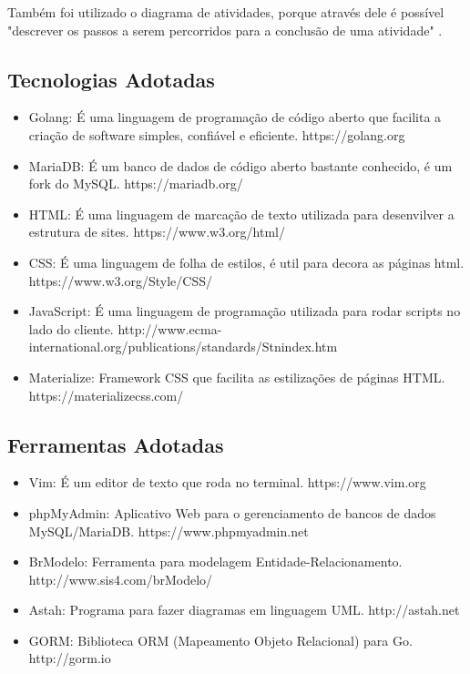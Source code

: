 \documentclass[12pt]{article}
\begin{document}
    Também foi utilizado o diagrama de atividades, porque através dele é possível "descrever os passos a serem percorridos para a conclusão de uma atividade" \cite{guedes18}.

	\subsection{Tecnologias Adotadas}

	\begin{itemize}
		\item Golang: É uma linguagem de programação de código aberto que facilita a criação de software simples, confiável e eficiente. https://golang.org	
		\item MariaDB: É um banco de dados de código aberto bastante conhecido, é um fork do MySQL. https://mariadb.org/
		\item HTML: É uma linguagem de marcação de texto utilizada para desenvilver a estrutura de sites. https://www.w3.org/html/
		\item CSS: É uma linguagem de folha de estilos, é util para decora as páginas html. https://www.w3.org/Style/CSS/
		\item JavaScript: É uma linguagem de programação utilizada para rodar scripts no lado do cliente. http://www.ecma-international.org/publications/standards/Stnindex.htm
		\item Materialize: Framework CSS que facilita as estilizações de páginas HTML. https://materializecss.com/
	\end{itemize}

	\subsection{Ferramentas Adotadas}

	\begin{itemize}
		\item Vim: É um editor de texto que roda no terminal. https://www.vim.org
		\item phpMyAdmin: Aplicativo Web para o gerenciamento de bancos de dados MySQL/MariaDB. https://www.phpmyadmin.net
		\item BrModelo: Ferramenta para modelagem Entidade-Relacionamento. http://www.sis4.com/brModelo/
		\item Astah: Programa para fazer diagramas em linguagem UML. http://astah.net
		\item GORM: Biblioteca ORM (Mapeamento Objeto Relacional) para Go. http://gorm.io
	\end{itemize}
\end{document}
